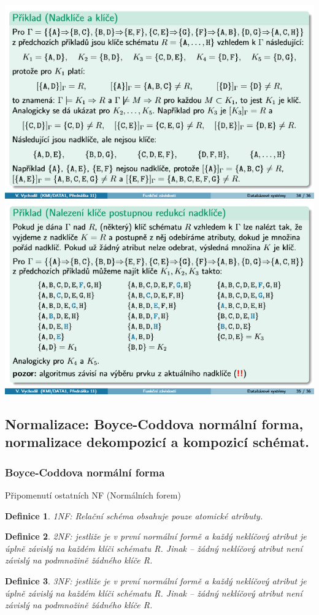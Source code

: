 \documentclass[10pt,a4paper]{article}
\newtheorem{definition}{Definice}
\begin{document}
\includegraphics[scale=0.65]{img/sesty_odstavec/nadklice_klice_obr.png}\\	
\includegraphics[scale=0.65]{img/sesty_odstavec/alg_nalezeni_klice_obr.png}\\	

\subsection{Normalizace: Boyce-Coddova normální forma, normalizace dekompozicí a kompozicí schémat.}
\subsubsection{Boyce-Coddova normální forma}
Připomenutí ostatních NF (Normálních forem)
\begin{definition}
1NF: Relační schéma obsahuje pouze atomické atributy.
\end{definition}
\begin{definition}
2NF: jestliže je v první normální formě a každý neklíčový atribut je úplně závislý na každém klíči schématu R. 
Jinak – žádný neklíčový atribut není závislý na podmnožině žádného klíče R.
\end{definition}
\begin{definition}
3NF: jestliže je v první normální formě a každý neklíčový atribut je úplně závislý na každém klíči schématu R. 
Jinak – žádný neklíčový atribut není závislý na podmnožině žádného klíče R.
\end{definition}
\end{document}

